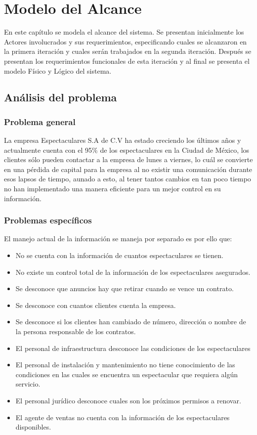 \chapter{Modelo del Alcance}
\label{cap:reqUsr}

	En este capítulo se modela el alcance del sistema. Se presentan inicialmente los Actores involucrados y sus requerimientos, especificando cuales se alcanzaron en la primera iteración y cuales serán trabajados en la segunda iteración. Después se presentan los requerimientos funcionales de esta iteración y al final se presenta el modelo Físico y Lógico del sistema.


\section{Análisis del problema}

\subsection{Problema general}
La empresa Espectaculares S.A de C.V ha estado creciendo los últimos años y actualmente cuenta con el 95\% de los espectaculares en la Ciudad de México, los clientes sólo pueden contactar a la empresa de lunes a viernes, lo cuál se convierte en una pérdida de capital para la empresa al no existir una comunicación durante esos lapsos de tiempo, aunado a esto, al tener tantos cambios en tan poco tiempo no han implementado una manera eficiente para un mejor control en su información.%

\subsection{Problemas específicos}
El manejo actual de la información se maneja por separado es por ello que:
\begin{itemize}
    \item No se cuenta con la información de cuantos espectaculares se tienen.
    \item No existe un control total de la información de los espectaculares asegurados.
    \item Se desconoce que anuncios hay que retirar cuando se vence un contrato.
    \item Se desconoce con cuantos clientes cuenta la empresa.
    \item Se desconoce si los clientes han cambiado de número, dirección o nombre de la persona responsable de los contratos.
    \item El personal de infraestructura desconoce las condiciones de los espectaculares
    \item El personal de instalación y mantenimiento no tiene conocimiento de las condiciones en las cuales se encuentra un espectacular que requiera algún servicio.
    \item El personal jurídico desconoce cuales son los próximos permisos a renovar.
    \item El agente de ventas no cuenta con la información de los espectaculares disponibles.
\end{itemize}

